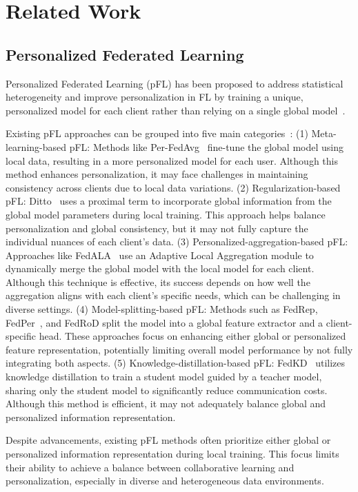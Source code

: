 \section{Related Work}
\subsection{Personalized Federated Learning}
Personalized Federated Learning (pFL) has been proposed to address statistical heterogeneity and improve personalization in FL by training a unique, personalized model for each client rather than relying on a single global model~\cite{t2020personalized,yi2023fedgh}. 

Existing pFL approaches can be grouped into five main categories~\cite{zhang2023pfllib}: (1) Meta-learning-based pFL: Methods like Per-FedAvg~\cite{NEURIPS2020_24389bfe} fine-tune the global model using local data, resulting in a more personalized model for each user. Although this method enhances personalization, it may face challenges in maintaining consistency across clients due to local data variations. (2) Regularization-based pFL: Ditto~\cite{pmlr-v139-li21h} uses a proximal term to incorporate global information from the global model parameters during local training. This approach helps balance personalization and global consistency, but it may not fully capture the individual nuances of each client's data. (3) Personalized-aggregation-based pFL: Approaches like FedALA~\cite{zhang2023fedala} use an Adaptive Local Aggregation module to dynamically merge the global model with the local model for each client. Although this technique is effective, its success depends on how well the aggregation aligns with each client’s specific needs, which can be challenging in diverse settings. (4) Model-splitting-based pFL: Methods such as FedRep, FedPer~\cite{arivazhagan2019federated}, and FedRoD split the model into a global feature extractor and a client-specific head. These approaches focus on enhancing either global or personalized feature representation, potentially limiting overall model performance by not fully integrating both aspects. (5) Knowledge-distillation-based pFL: FedKD~\cite{wu2022communication} utilizes knowledge distillation to train a student model guided by a teacher model, sharing only the student model to significantly reduce communication costs. Although this method is efficient, it may not adequately balance global and personalized information representation.

Despite advancements, existing pFL methods often prioritize either global or personalized information representation during local training. This focus limits their ability to achieve a balance between collaborative learning and personalization, especially in diverse and heterogeneous data environments.

